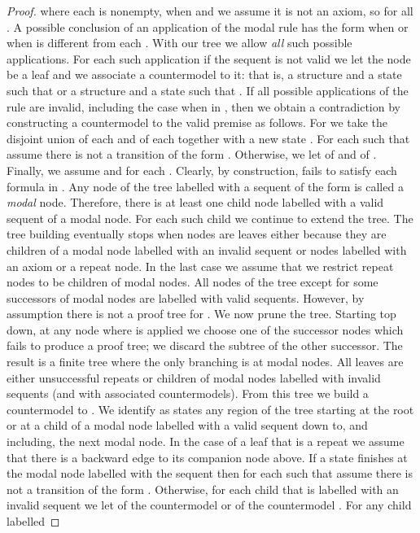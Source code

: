 \documentclass[copyright,creativecommons]{eptcs}
\def\w{\emph}
\begin{document}
\begin{proof}
where each  is nonempty,  when 
and we assume it is not an axiom, 
so  for all . A  possible conclusion 
of an application of  the modal rule has the  form  when   or 
when  is different from each . 
With our tree we allow \w{all} such possible applications.
For each such application if the sequent is not valid we let the node be 
a leaf and we associate a countermodel to it: that is, a structure
 and a state  such that
 or a structure  and  a state 
such that . If all
possible applications of the rule are invalid, including the case
when  in , then we obtain a contradiction
by  constructing  a countermodel to the valid premise
 as follows. For  we take the disjoint
union of each   and of each  together with a new state .
For each  such that  assume there
is not  a transition of the form . Otherwise,
we let  of  and 
of . 
Finally, we assume  and 
for each .  Clearly, by construction,  fails to satisfy each  formula
in . Any node of the tree
labelled with a sequent of the form   is called a \emph{modal}
node. Therefore, there is at least one child node labelled with a valid
sequent of a modal node. For each such child we continue to extend the tree.
The tree building  eventually stops when nodes are leaves either because
they are children of a modal node labelled with an invalid sequent or
nodes 
labelled with an axiom or a repeat node.  In the last case we assume that we
restrict  repeat nodes to be children  of modal nodes.  
All nodes of the tree except for some successors of modal
nodes are labelled with valid sequents. 
However, by assumption there is not a proof tree for .
We now prune the tree. Starting top down, at any node where  is applied
we choose one of the successor nodes which fails to produce a
proof tree; we discard the subtree
of  the other successor.
The result is a finite tree
where the  only branching is at modal nodes.
All leaves are either unsuccessful repeats or children of modal nodes
labelled with invalid sequents (and with associated countermodels). 
From this tree we build a countermodel
to . We identify as states any region of the tree starting at the
root or at a child of a modal node labelled with a valid sequent down to,
and including, the next modal node. In the case of a leaf that is  a 
repeat we assume that there is a backward edge to its companion node
above. If a state  finishes at
the modal node labelled with the sequent  then 
for each  such that  assume there
is not  a transition of the form . Otherwise, for each
child that is labelled with an invalid sequent 
we let  of the countermodel
 or  
of the countermodel . For any child labelled 

\end{proof}
\end{document}
